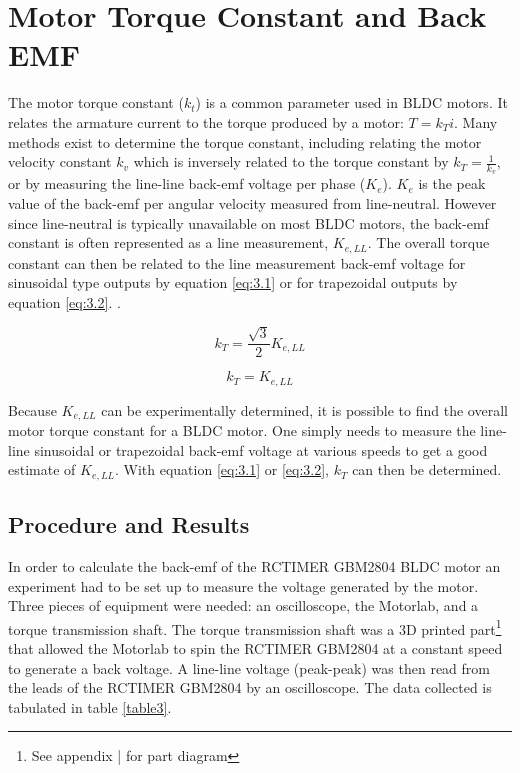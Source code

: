 \section{Motor Torque Constant and Back EMF}
The motor torque constant (\(k_t\)) is a common parameter used in BLDC motors. It relates the armature current to the torque produced by a motor: \(T = k_T i \). Many methods exist to determine the torque constant, including relating the motor velocity constant \(k_v\) which is inversely related to the torque constant by \(k_T = \frac{1}{k_v} \), or by measuring the line-line back-emf voltage per phase (\(K_e\)). \(K_e\) is the peak value of the back-emf per angular velocity measured from line-neutral. However since line-neutral is typically unavailable on most BLDC motors, the back-emf constant is often represented as a line measurement, \(K_{e,LL}\). The overall torque constant can then be related to the line measurement back-emf voltage for sinusoidal type outputs by equation \ref{eq:3.1} or for trapezoidal outputs by equation \ref{eq:3.2}. \citep{5}. 

\begin{equation} \label{eq:3.1}
k_T = \frac{\sqrt{3}}{2} K_{e,LL}
\end{equation}

\begin{equation} \label{eq:3.2}
k_T = K_{e,LL}
\end{equation}

Because \(K_{e,LL}\) can be experimentally determined, it is possible to find the overall motor torque constant for a BLDC motor. One simply needs to measure the line-line sinusoidal or trapezoidal back-emf voltage at various speeds to get a good estimate of \(K_{e,LL}\). With equation \ref{eq:3.1} or \ref{eq:3.2}, \(k_T\) can then be determined.

\subsection{Procedure and Results}
In order to calculate the back-emf of the RCTIMER GBM2804 BLDC motor an experiment had to be set up to measure the voltage generated by the motor. Three pieces of equipment were needed: an oscilloscope, the Motorlab, and a torque transmission shaft. The torque transmission shaft was a 3D printed part\footnote{See appendix | for part diagram} that allowed the Motorlab to spin the RCTIMER GBM2804 at a constant speed to generate a back voltage. A line-line voltage (peak-peak) was then read from the leads of the RCTIMER GBM2804 by an oscilloscope. The data collected is tabulated in table \ref{table3}.

